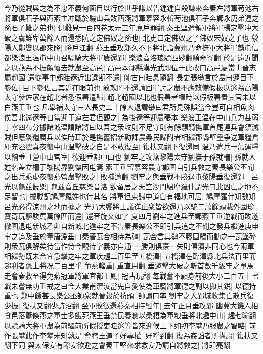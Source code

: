 今乃從賊與之為不忠不義何面目以行於世乎謙以告鍾鍾自殺謙來奔秦左將軍苟池右將軍俱石子與西燕主冲戰於驪山兵敗西燕將軍慕容永斬苟池俱石子奔鄴永廆弟運之孫石子難之弟也|{
	俱難見一百四卷太元三年廆戶罪翻}
秦王堅遣領軍將軍楊定擊冲大破之虜鮮卑萬餘人而還悉阬之定佛奴之孫也|{
	北史曰定佛奴之子佛奴宋奴之子也}
滎陽人鄭燮以郡來降|{
	降戶江翻}
燕王垂攻鄴久不下將北詣冀州乃命撫軍大將軍麟屯信都樂浪王温屯中山召驃騎大將軍農還鄴|{
	樂浪音洛琅驃匹妙翻騎奇寄翻}
於是遠近聞之以燕為不振頗懷去就農至高邑|{
	高邑本鄗縣漢光武即位于此改曰高邑屬常山晉志屬趙國}
遣從事中郎眭邃近出違期不還|{
	師古曰眭息隨翻}
長史張攀言於農曰邃目下參佐|{
	目下參佐言其近在眼前也}
敢欺罔不還請回軍討之農不應敕備假板以邃為高陽太守參佐家在趙北者悉假署遣歸|{
	趙北趙國以北也假署者權時以假板署置其官未以白燕王垂也}
凡舉補太守三人長史二十餘人退謂攀曰君所見殊誤當今豈可自相魚肉俟吾北還邃等自當迎于道左君但觀之|{
	為後邃等迎農張本}
樂浪王温在中山兵力甚弱丁零四布分據諸城温謂諸將曰以吾之衆攻則不足守則有餘驃騎撫軍首尾連兵會須滅賊但應聚糧厲兵以俟時耳於是撫舊招新勸課農桑民歸附者相繼郡縣壁壘争送軍糧倉庫充溢翟真夜襲中山温擊破之自是不敢復至|{
	復扶又翻下復還同}
温乃遣兵一萬運糧以餉垂且營中山宫室|{
	欲迎垂都中山也}
劉牢之攻燕黎陽太守劉撫于孫就柵|{
	孫就人姓名盖立柵于黎陽界劉憮因屯焉}
燕王垂留慕容農守鄴圍自引兵救之秦長樂公丕聞之出兵乘虚夜襲燕營農擊敗之|{
	敗補邁翻}
劉牢之與垂戰不勝退屯黎陽垂復還鄴　呂光以龜兹饒樂|{
	龜兹音丘慈樂音洛}
欲留居之天竺沙門鳩摩羅什謂光曰此凶亡之地不足留也|{
	據載記鳩摩羅姓也什其名}
將軍但東歸中道自有福地可居|{
	鳩摩羅什知數知呂光必得涼州之地而據之}
光乃大饗將士議進止衆皆欲還乃以駝二萬餘頭載外國珍寶奇玩驅駿馬萬餘匹而還|{
	還音旋又如字}
夏四月劉牢之進兵至鄴燕王垂逆戰而敗遂撤圍退屯新城乙卯自新城北遁牢之不告秦長樂公丕即引兵追之丕聞之發兵繼進庚申牢之追及垂於董唐淵垂曰秦晉瓦合相待為彊|{
	瓦合言其勢不膠固觸而動之一瓦墜碎則衆瓦俱解矣待當作恃今觀待字義亦自通}
一勝則俱豪一失則俱潰非同心也今兩軍相繼勢既未合宜急擊之牢之軍疾趨二百里至五橋澤|{
	五橋澤在臨漳縣北兵法百里而趨利者蹶上將况二百里乎}
争燕輜重|{
	重直用翻}
垂邀撃大破之斬首數千級牢之單馬走會秦救至得免燕冠軍將軍宜都王鳳|{
	冠古玩翻}
每戰奮不顧身前後大小二百五十七戰未嘗無功垂戒之曰今大業甫濟汝當先自愛使為車騎將軍德之副以抑其鋭|{
	以德持重也}
鄴中饑甚長樂公丕帥衆就晉穀於枋頭|{
	帥讀曰率}
劉牢之入鄴城收集亡散兵復少振|{
	復扶又翻少詩沼翻}
坐軍敗徵還燕秦相持經年|{
	去年正月垂攻鄴}
幽冀大饑人相食邑落蕭條燕之軍士多餓死燕王垂禁民養蠶以桑椹為軍粮垂將北趣中山|{
	趣七喻翻}
以驃騎大將軍農為前驅前所假授吏眭邃等皆來迎候上下如初李攀乃服農之智略|{
	前作張攀此作李攀未知孰是}
會稽王道子好專權|{
	好呼到翻}
復為姦謟者所搆扇|{
	復扶又翻下同}
與太保安有隙安欲避之會秦王堅來求救安乃請自將救之|{
	將即亮翻}

